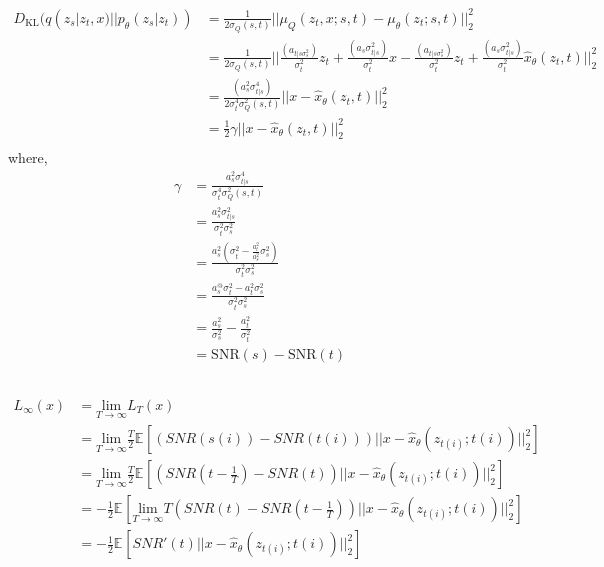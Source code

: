 \documentclass{article}
\newcommand*{\ex}[1]{
    \mathbb{E}_{#1}
}
\begin{document}
\subsection{}
\begin{align*}
    D_{\text{KL}}(q(z_s|z_t, x) || p_{\theta}(z_s|z_t)) 
    &=\frac{1}{2\sigma_Q(s, t)}||\mu_Q(z_t, x; s, t) - \mu_{\theta}(z_t;s, t)||_2^2\\
    &=\frac{1}{2\sigma_Q(s, t)}||\frac{(a_{t|s\sigma_s^2})}{\sigma_t^2}z_t +  \frac{(a_s\sigma_{t|s}^2)}{\sigma_t^2}x - \frac{(a_{t|s\sigma_s^2})}{\sigma_t^2}z_t +  \frac{(a_s\sigma_{t|s}^2)}{\sigma_t^2}\hat{x}_{\theta}(z_t, t) ||_2^2\\
    &=\frac{(a_s^2\sigma_{t|s}^4)}{2\sigma_t^4\sigma_Q^2(s, t)}||x - \hat{x}_{\theta}(z_t, t) ||_2^2\\
    &=\frac{1}{2}\gamma||x - \hat{x}_{\theta}(z_t, t) ||_2^2\\
\end{align*}
where,
\begin{align*}
    \gamma 
    &= \frac{a_s^2\sigma_{t|s}^4}{\sigma_t^4\sigma_Q^2(s, t)} \\
    &= \frac{a_s^2\sigma_{t|s}^2}{\sigma_t^2\sigma_s^2} \\
    &= \frac{a_s^2(\sigma_t^2 - \frac{a_t^2}{a_s^2}\sigma_s^2)}{\sigma_t^2\sigma_s^2} \\
    &= \frac{a_s^@\sigma_t^2 - a_t^2\sigma_s^2}{\sigma_t^2\sigma_s^2} \\
    &= \frac{a_s^2}{\sigma_s^2} - \frac{a_t^2}{\sigma_t^2}\\
    &= \text{SNR}(s) - \text{SNR}(t)
\end{align*}

\subsection{}
\begin{align*}
    L_{\infty}(x) 
    &= \underset{T\to \infty}{\text{lim}} L_{T}(x) \\
    &=\underset{T\to \infty}{\text{lim}} \frac{T}{2}\ex{}[(SNR(s(i)) - SNR(t(i)))||x-\hat{x}_{\theta}(z_{t(i)};t(i))||_2^2] \\
    &=\underset{T\to \infty}{\text{lim}} \frac{T}{2}\ex{}[(SNR(t - \frac{1}{T}) - SNR(t))||x-\hat{x}_{\theta}(z_{t(i)};t(i))||_2^2] \\
    &= -\frac{1}{2}\ex{}[\underset{T\to \infty}{\text{lim}}T(SNR(t) - SNR(t - \frac{1}{T}))||x-\hat{x}_{\theta}(z_{t(i)};t(i))||_2^2] \\
    &= -\frac{1}{2}\ex{}[SNR'(t)||x-\hat{x}_{\theta}(z_{t(i)};t(i))||_2^2] \\
\end{align*}
\end{document}
